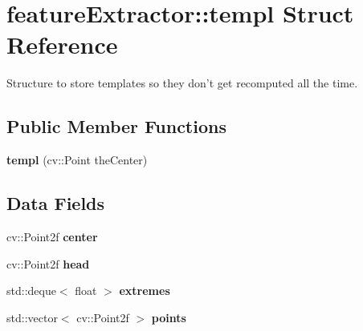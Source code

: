 \hypertarget{structfeatureExtractor_1_1templ}{
\section{featureExtractor::templ Struct Reference}
\label{structfeatureExtractor_1_1templ}
}


Structure to store templates so they don't get recomputed all the time.  


\subsection*{Public Member Functions}
\begin{DoxyCompactItemize}
\item 
\hypertarget{structfeatureExtractor_1_1templ_aa8546f502cae9bc3c1746d0eca0d8285}{
{\bfseries templ} (cv::Point theCenter)}
\label{structfeatureExtractor_1_1templ_aa8546f502cae9bc3c1746d0eca0d8285}

\end{DoxyCompactItemize}
\subsection*{Data Fields}
\begin{DoxyCompactItemize}
\item 
\hypertarget{structfeatureExtractor_1_1templ_a5684638ac8c985287990db7557394bf3}{
cv::Point2f {\bfseries center}}
\label{structfeatureExtractor_1_1templ_a5684638ac8c985287990db7557394bf3}

\item 
\hypertarget{structfeatureExtractor_1_1templ_a7e2e6582c450ad47c9069bad795494f5}{
cv::Point2f {\bfseries head}}
\label{structfeatureExtractor_1_1templ_a7e2e6582c450ad47c9069bad795494f5}

\item 
\hypertarget{structfeatureExtractor_1_1templ_a7cb2d99fa9a366ef53d9b50293ce62a7}{
std::deque$<$ float $>$ {\bfseries extremes}}
\label{structfeatureExtractor_1_1templ_a7cb2d99fa9a366ef53d9b50293ce62a7}

\item 
\hypertarget{structfeatureExtractor_1_1templ_ae7fcf10a909a81421e241a1fa36e2665}{
std::vector$<$ cv::Point2f $>$ {\bfseries points}}
\label{structfeatureExtractor_1_1templ_ae7fcf10a909a81421e241a1fa36e2665}

\end{DoxyCompactItemize}
